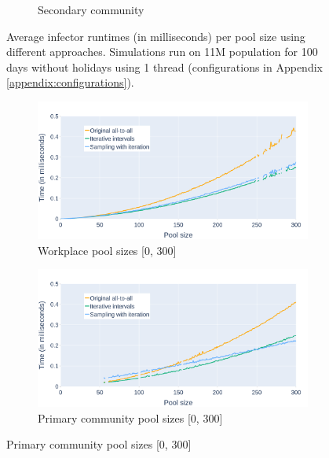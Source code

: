\begin{figure}
\begin{subfigure}{.8\linewidth}
        \caption{Secondary community}
        \label{fig:times_avg_swi_pType_secondary_full}
    \end{subfigure}
    \caption{Average infector runtimes (in milliseconds) per pool size using different approaches. Simulations run on 11M population for 100 days without holidays using 1 thread (configurations in Appendix \ref{appendix:configurations}).}
    \label{fig:times_avg_swi_pType_full}
\end{figure}

\begin{figure}
    \centering
    \begin{subfigure}{.8\linewidth}
        \centering
        \includegraphics[width=\textwidth]{4 - Sampling/fig/sampling_with_iteration/times_avg_swi_pType_workplace.png}
        \caption{Workplace pool sizes [0, 300]}
        \label{fig:times_avg_swi_pType_workplace}
    \end{subfigure}
    \begin{subfigure}{.8\linewidth}
        \centering
        \includegraphics[width=\textwidth]{4 - Sampling/fig/sampling_with_iteration/times_avg_swi_pType_primary.png}
        \caption{Primary community pool sizes [0, 300]}
        \label{fig:times_avg_swi_pType_primary}

\end{subfigure}
\end{figure}
